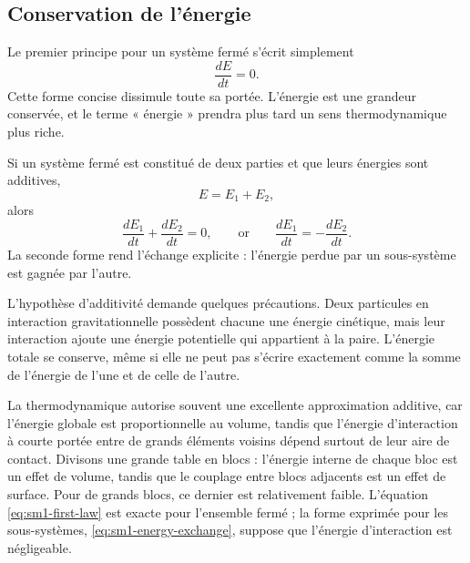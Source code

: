 \subsection{Conservation de l’énergie}

Le premier principe pour un système fermé s’écrit simplement
\begin{equation}
 \frac{dE}{dt}=0.
 \label{eq:sm1-first-law}
\end{equation}
Cette forme concise dissimule toute sa portée. L’énergie est une grandeur conservée, et le terme « énergie » prendra plus tard un sens thermodynamique plus riche.

Si un système fermé est constitué de deux parties et que leurs énergies sont additives,
\begin{equation}
 E=E_1+E_2,
\end{equation}
alors
\begin{equation}
 \frac{dE_1}{dt}+\frac{dE_2}{dt}=0,
 \qquad\text{or}\qquad
 \frac{dE_1}{dt}=-\frac{dE_2}{dt}.
 \label{eq:sm1-energy-exchange}
\end{equation}
La seconde forme rend l’échange explicite : l’énergie perdue par un sous-système est gagnée par l’autre.

L’hypothèse d’additivité demande quelques précautions. Deux particules en interaction gravitationnelle possèdent chacune une énergie cinétique, mais leur interaction ajoute une énergie potentielle qui appartient à la paire. L’énergie totale se conserve, même si elle ne peut pas s’écrire exactement comme la somme de l’énergie de l’une et de celle de l’autre.

La thermodynamique autorise souvent une excellente approximation additive, car l’énergie globale est proportionnelle au volume, tandis que l’énergie d’interaction à courte portée entre de grands éléments voisins dépend surtout de leur aire de contact. Divisons une grande table en blocs : l’énergie interne de chaque bloc est un effet de volume, tandis que le couplage entre blocs adjacents est un effet de surface. Pour de grands blocs, ce dernier est relativement faible. L’équation
\eqref{eq:sm1-first-law} est exacte pour l’ensemble fermé ; la forme exprimée pour les sous-systèmes,
\eqref{eq:sm1-energy-exchange}, suppose que l’énergie d’interaction est négligeable.

\begin{classroomqa}
\end{classroomqa}

